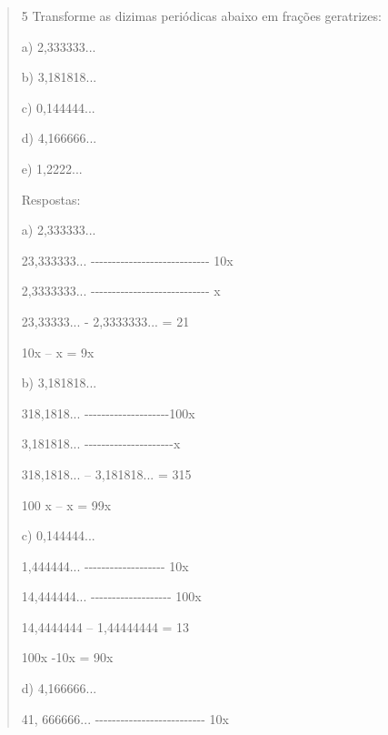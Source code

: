 \begin{quote}



\num{5} Transforme as dizimas periódicas abaixo em frações geratrizes:

a) 2,333333...

b) 3,181818...

c) 0,144444...

d) 4,166666...

e) 1,2222...


Respostas:

a) 2,333333...

23,333333...
-\/-\/-\/-\/-\/-\/-\/-\/-\/-\/-\/-\/-\/-\/-\/-\/-\/-\/-\/-\/-\/-\/-\/-\/-\/-\/-\/-
10x

2,3333333...
-\/-\/-\/-\/-\/-\/-\/-\/-\/-\/-\/-\/-\/-\/-\/-\/-\/-\/-\/-\/-\/-\/-\/-\/-\/-\/-\/-
x

23,33333... - 2,3333333... = 21

10x -- x = 9x


b) 3,181818...

318,1818...
-\/-\/-\/-\/-\/-\/-\/-\/-\/-\/-\/-\/-\/-\/-\/-\/-\/-\/-\/-100x

3,181818...
-\/-\/-\/-\/-\/-\/-\/-\/-\/-\/-\/-\/-\/-\/-\/-\/-\/-\/-\/-\/-x

318,1818... -- 3,181818... = 315

100 x -- x = 99x


c) 0,144444...

1,444444... -\/-\/-\/-\/-\/-\/-\/-\/-\/-\/-\/-\/-\/-\/-\/-\/-\/-\/- 10x

14,444444... -\/-\/-\/-\/-\/-\/-\/-\/-\/-\/-\/-\/-\/-\/-\/-\/-\/-\/-
100x

14,4444444 -- 1,44444444 = 13

100x -10x = 90x


d) 4,166666...

41, 666666...
-\/-\/-\/-\/-\/-\/-\/-\/-\/-\/-\/-\/-\/-\/-\/-\/-\/-\/-\/-\/-\/-\/-\/-\/-\/-
10x


\end{quote}
